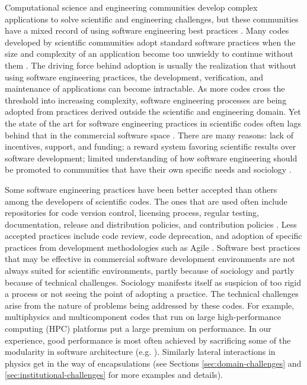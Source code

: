 \label{sec:introduction}
Computational science and engineering communities develop
complex applications to solve scientific and engineering challenges,
but these communities have a mixed record of using software
engineering best practices
\cite{hannay2009,Nguyen-Hoan}. Many codes developed by
scientific communities adopt standard software practices when the size
and complexity of an application become too unwieldy to continue
without them \cite{cc2012}. The driving force behind adoption is
usually the realization that without using software engineering
practices, the development, verification, and maintenance of
applications can become intractable. As more codes cross the threshold
into increasing complexity, software engineering processes are being
adopted from practices derived outside the scientific and
engineering domain. Yet the state of the art for software engineering
practices in scientific codes often lags behind that in the commercial
software space \cite{basili2008understanding, hochstein2008asc,segal2008developing}. 
There are many reasons: lack of incentives, support, and
funding; a reward system favoring scientific results over software 
development; limited understanding of how software engineering
should be promoted to communities that have their own 
specific needs and sociology \cite{carver2007software,Heroux2009}.

Some software engineering practices have been better accepted than others
among the developers of scientific codes. The ones that are
used often include repositories for code version control,
licensing process, regular testing, documentation, release and distribution
policies, and contribution policies \cite{ carver2012software, carver2007software,
cc2012, Dubey2014}. Less accepted practices include code review,
code deprecation, and adoption of specific practices from development
methodologies such as Agile \cite{agile}. Software best practices that
may be effective in commercial software development environments are
not always suited for scientific environments, partly because of
sociology and partly because of technical 
challenges. Sociology manifests itself as suspicion of too rigid a
process or not seeing the point of adopting a practice. The
technical challenges arise from the nature of problems being addressed by
these codes. For example, multiphysics and multicomponent  
codes that run on large high-performance computing 
(HPC) platforms put a large premium on performance. In our
experience, good performance is most often achieved by sacrificing
some of the modularity in software architecture
(e.g. \cite{Dubey1999}). Similarly lateral interactions in physics get
in the way of encapsulations (see Sections \ref{sec:domain-challenges}
and \ref{sec:institutional-challenges} for more examples and details).

